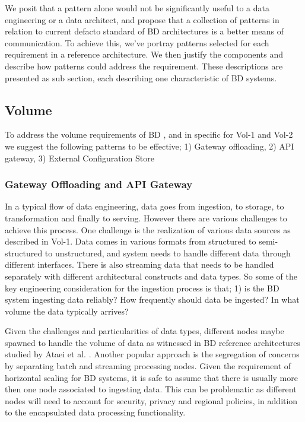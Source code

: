 \documentclass[a4paper,11pt,article,oneside]{memoir}
\begin{document}
We posit that a pattern alone would not be significantly useful to a data engineering or a data architect, and propose that a collection of patterns in relation to current defacto standard of BD architectures is a better means of communication. To achieve this, we've portray patterns selected for each requirement in a reference architecture. We then justify the components and describe how patterns could address the requirement. These descriptions are presented as sub section, each describing one characteristic of BD systems. 


\subsection{Volume}


To address the volume requirements of BD , and in specific for Vol-1 and Vol-2 we suggest the following patterns to be effective; 1) Gateway offloading, 2) API gateway, 3) External Configuration Store

\subsubsection{Gateway Offloading and API Gateway}

In a typical flow of data engineering, data goes from ingestion, to storage, to transformation and finally to serving. However there are various challenges to achieve this process. One challenge is the realization of various data sources as described in Vol-1. Data comes in various formats from structured to semi-structured to unstructured, and system needs to handle different data through different interfaces. There is also streaming data that needs to be handled separately with different architectural constructs and data types. So some of the key engineering consideration for the ingestion process is that; 1) is the BD system ingesting data reliably? How frequently should data be ingested? In what volume the data typically arrives?

Given the challenges and particularities of data types, different nodes maybe spawned to handle the volume of data as witnessed in BD reference architectures studied by Ataei et al. \cite{ataei2020big}. Another popular approach is the segregation of concerns by separating batch and streaming processing nodes. Given the requirement of horizontal scaling for BD systems, it is safe to assume that there is usually more then one node associated to ingesting data. This can be problematic as different nodes will need to account for security, privacy and regional policies, in addition to the encapsulated data processing functionality. 
\end{document}
